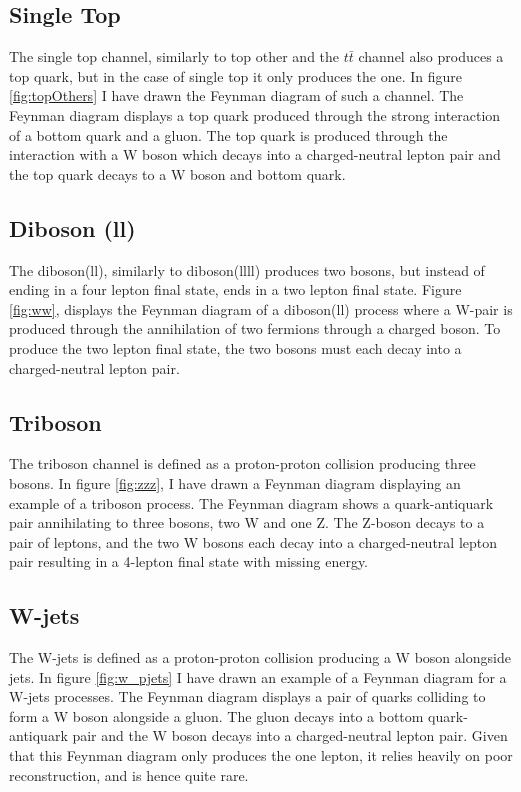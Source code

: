 \subsection{Single Top}
The single top channel, similarly to top other and the $t\bar{t}$ channel also produces a top quark, but in the case of single top 
it only produces the one. In figure \ref{fig:topOthers} I have drawn the Feynman diagram of such a channel. The Feynman diagram displays a
top quark produced through the strong interaction of a bottom quark and a gluon. The top quark is produced through the interaction with a W boson 
which decays into a charged-neutral lepton pair and the top quark decays to a W boson and bottom quark. 
\subsection{Diboson (ll)}
The diboson(ll), similarly to diboson(llll) produces two bosons, but instead of ending in a four lepton final state, ends in a two lepton final state.
Figure \ref{fig:ww}, displays the Feynman diagram of a diboson(ll) process where a W-pair is produced through the annihilation of two fermions through 
a charged boson. To produce the two lepton final state, the two bosons must each decay into a charged-neutral lepton pair. 
\subsection{Triboson}
The triboson channel is defined as a proton-proton collision producing three bosons.  In figure \ref{fig:zzz}, I have drawn a Feynman diagram 
displaying an example of a triboson process. The Feynman diagram shows a quark-antiquark pair annihilating to three bosons, two W and one Z. The Z-boson decays 
to a pair of leptons, and the two W bosons each decay into a charged-neutral lepton pair resulting in a 4-lepton final state with missing energy.
\subsection{W-jets}
The W-jets is defined as a proton-proton collision producing a W boson alongside jets. In figure \ref{fig:w_pjets} I have drawn an example 
of a Feynman diagram for a W-jets processes. The Feynman diagram displays a pair of quarks colliding to form a W boson alongside a gluon. The gluon decays 
into a bottom quark-antiquark pair and the W boson decays into a charged-neutral lepton pair. Given that this Feynman diagram only produces the one lepton, it 
relies heavily on poor reconstruction, and is hence quite rare.
